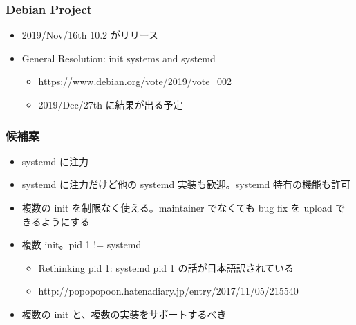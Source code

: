 \documentclass[cjk,dvipdfmx,10pt,compress,%
hyperref={bookmarks=true,bookmarksnumbered=true,bookmarksopen=false,%
colorlinks=false,%
pdftitle={第 153 回 関西 Debian 勉強会},%
pdfauthor={おおつき},%
pdfsubject={資料},%
}]{beamer}
\begin{document}
\begin{frame}[fragile]
  \frametitle{Debian Project}
  \begin{itemize}
  \item 2019/Nov/16th 10.2 がリリース
  \item General Resolution: init systems and systemd
     \begin{itemize}
       \item \url{https://www.debian.org/vote/2019/vote_002} 
       \item 2019/Dec/27th に結果が出る予定
     \end{itemize}
  \end{itemize}
\end{frame}

\begin{frame}[fragile]
  \frametitle{候補案}
  \begin{itemize}
    \item systemd に注力
    \item systemd に注力だけど他の systemd 実装も歓迎。systemd 特有の機能も許可
    \item 複数の init を制限なく使える。maintainer でなくても bug fix を upload できるようにする  
    \item 複数 init。pid 1 != systemd 
    \begin{itemize}
        \item Rethinking pid 1: systemd pid 1 の話が日本語訳されている
	\item http://popopopoon.hatenadiary.jp/entry/2017/11/05/215540
    \end{itemize}
    \item 複数の init と、複数の実装をサポートするべき
  \end{itemize}
\end{frame}

\end{document}
